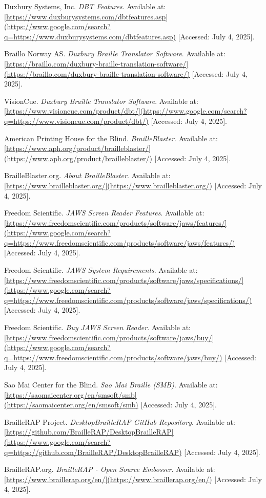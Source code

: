 \begin{thebibliography}{99}

 Duxbury Systems, Inc. \textit{DBT Features}. Available at: \url{[https://www.duxburysystems.com/dbtfeatures.asp](https://www.google.com/search?q=https://www.duxburysystems.com/dbtfeatures.asp)} [Accessed: July 4, 2025].

 Braillo Norway AS. \textit{Duxbury Braille Translator Software}. Available at: \url{[https://braillo.com/duxbury-braille-translation-software/](https://braillo.com/duxbury-braille-translation-software/)} [Accessed: July 4, 2025].

 VisionCue. \textit{Duxbury Braille Translator Software}. Available at: \url{[https://www.visioncue.com/product/dbt/](https://www.google.com/search?q=https://www.visioncue.com/product/dbt/)} [Accessed: July 4, 2025].

 American Printing House for the Blind. \textit{BrailleBlaster}. Available at: \url{[https://www.aph.org/product/brailleblaster/](https://www.aph.org/product/brailleblaster/)} [Accessed: July 4, 2025].

 BrailleBlaster.org. \textit{About BrailleBlaster}. Available at: \url{[https://www.brailleblaster.org/](https://www.brailleblaster.org/)} [Accessed: July 4, 2025].

 Freedom Scientific. \textit{JAWS Screen Reader Features}. Available at: \url{[https://www.freedomscientific.com/products/software/jaws/features/](https://www.google.com/search?q=https://www.freedomscientific.com/products/software/jaws/features/)} [Accessed: July 4, 2025].

 Freedom Scientific. \textit{JAWS System Requirements}. Available at: \url{[https://www.freedomscientific.com/products/software/jaws/specifications/](https://www.google.com/search?q=https://www.freedomscientific.com/products/software/jaws/specifications/)} [Accessed: July 4, 2025].

 Freedom Scientific. \textit{Buy JAWS Screen Reader}. Available at: \url{[https://www.freedomscientific.com/products/software/jaws/buy/](https://www.google.com/search?q=https://www.freedomscientific.com/products/software/jaws/buy/)} [Accessed: July 4, 2025].

 Sao Mai Center for the Blind. \textit{Sao Mai Braille (SMB)}. Available at: \url{[https://saomaicenter.org/en/smsoft/smb](https://saomaicenter.org/en/smsoft/smb)} [Accessed: July 4, 2025].

 BrailleRAP Project. \textit{DesktopBrailleRAP GitHub Repository}. Available at: \url{[https://github.com/BrailleRAP/DesktopBrailleRAP](https://www.google.com/search?q=https://github.com/BrailleRAP/DesktopBrailleRAP)} [Accessed: July 4, 2025].

 BrailleRAP.org. \textit{BrailleRAP - Open Source Embosser}. Available at: \url{[https://www.braillerap.org/en/](https://www.braillerap.org/en/)} [Accessed: July 4, 2025].

\end{thebibliography}

